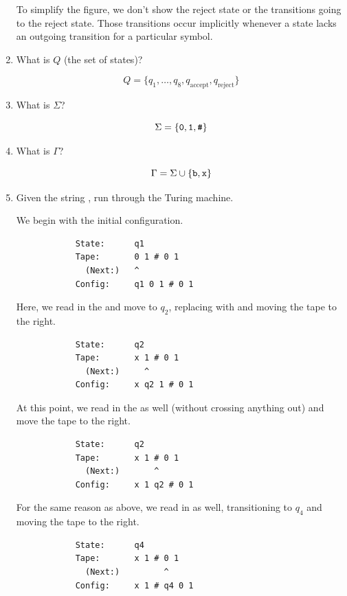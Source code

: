 \documentclass[letterpaper]{article}
\begin{document}
\begin{enumerate}
\begin{mdframed}[nobreak=true]
        To simplify the figure, we don't show the reject state or the transitions going to the reject state. Those transitions occur implicitly whenever a state lacks an outgoing transition for a particular symbol.
    \end{mdframed}

    \item What is $Q$ (the set of states)?
    \begin{mdframed}[]
        \[Q = \{q_1, \dots, q_8, q_{\text{accept}}, q_{\text{reject}}\}\]
    \end{mdframed}

    \item What is $\Sigma$?
    \begin{mdframed}[]
        \[\Sigma = \{\texttt{0}, \texttt{1}, \texttt{\#}\}\]
    \end{mdframed}

    \item What is $\Gamma$?
    \begin{mdframed}[]
        \[\Gamma = \Sigma \cup \{\texttt{b}, \texttt{x}\}\]
    \end{mdframed}

    \item Given the string , run through the Turing machine. 
    \begin{mdframed}[]
        We begin with the initial configuration. 
        \begin{verbatim}
            State:      q1
            Tape:       0 1 # 0 1
              (Next:)   ^
            Config:     q1 0 1 # 0 1
        \end{verbatim}

        Here, we read in the  and move to $q_2$, replacing  with  and moving the tape to the right. 
        \begin{verbatim}
            State:      q2
            Tape:       x 1 # 0 1
              (Next:)     ^
            Config:     x q2 1 # 0 1
        \end{verbatim}

        At this point, we read in the  as well (without crossing anything out) and move the tape to the right.  
        \begin{verbatim}
            State:      q2
            Tape:       x 1 # 0 1
              (Next:)       ^
            Config:     x 1 q2 # 0 1
        \end{verbatim}

        For the same reason as above, we read in \code{\#} as well, transitioning to $q_4$ and moving the tape to the right.
        \begin{verbatim}
            State:      q4
            Tape:       x 1 # 0 1
              (Next:)         ^
            Config:     x 1 # q4 0 1
        \end{verbatim}


\end{mdframed}
\end{enumerate}
\end{document}
